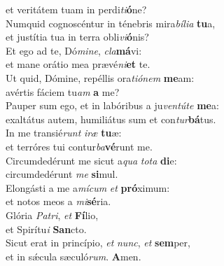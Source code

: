 \evenverse et veritátem tuam in perdi\textit{ti}\textbf{ó}ne?\\
\oddverse Numquid cognoscéntur in ténebris mira\textit{bí}\textit{li}\textit{a} \textbf{tu}a,~\*\\
\oddverse et justítia tua in terra obli\textit{vi}\textbf{ó}nis?\\
\evenverse Et ego ad te, Dó\textit{mi}\textit{ne}, \textit{cla}\textbf{má}vi:~\*\\
\evenverse et mane orátio mea prævé\textit{ni}\textbf{et} te.\\
\oddverse Ut quid, Dómine, repéllis ora\textit{ti}\textit{ó}\textit{nem} \textbf{me}am:~\*\\
\oddverse avértis fáciem tu\textit{am} \textbf{a} me?\\
\evenverse Pauper sum ego, et in labóribus a ju\textit{ven}\textit{tú}\textit{te} \textbf{me}a:~\*\\
\evenverse exaltátus autem, humiliátus sum et con\textit{tur}\textbf{bá}tus.\\
\oddverse In me transié\textit{runt} \textit{i}\textit{ræ} \textbf{tu}æ:~\*\\
\oddverse et terróres tui contur\textit{ba}\textbf{vé}runt me.\\
\evenverse Circumdedérunt me sicut a\textit{qua} \textit{to}\textit{ta} \textbf{di}e:~\*\\
\evenverse circumdedérunt \textit{me} \textbf{si}mul.\\
\oddverse Elongásti a me a\textit{mí}\textit{cum} \textit{et} \textbf{pró}ximum:~\*\\
\oddverse et notos meos a \textit{mi}\textbf{sé}ria.\\
\evenverse Glória \textit{Pa}\textit{tri}, \textit{et} \textbf{Fí}lio,~\*\\
\evenverse et Spirítu\textit{i} \textbf{San}cto.\\
\oddverse Sicut erat in princípio, \textit{et} \textit{nunc}, \textit{et} \textbf{sem}per,~\*\\
\oddverse et in sǽcula sæculó\textit{rum}. \textbf{A}men.\\
